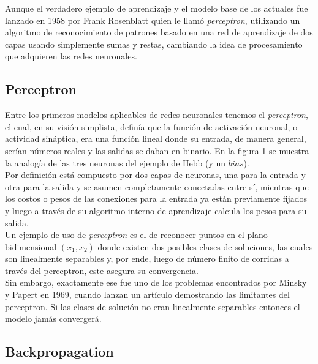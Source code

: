 \documentclass{llncs}
\begin{document}
\begin{multicols}{2}[]
Aunque el verdadero ejemplo de aprendizaje y el modelo base de los actuales fue lanzado en 1958 por Frank Rosenblatt quien le llam\'o
\textit{perceptron}, utilizando un algoritmo de reconocimiento de patrones basado en una red de aprendizaje de dos capas usando
simplemente sumas y restas, cambiando la idea de procesamiento que adquieren las redes neuronales.

\subsection{Perceptron}



Entre los primeros modelos aplicables de redes neuronales tenemos el \textit{perceptron}, el cual, en su visi\'on simplista, defin\'ia que
la funci\'on de activaci\'on neuronal, o actividad sin\'aptica, era una funci\'on lineal donde su entrada, de manera general, ser\'ian n\'umeros
reales y las salidas se daban en binario. En la figura 1 se muestra la analog\'ia de las tres neuronas del ejemplo de Hebb (y un $bias$).\\

Por definici\'on est\'a compuesto por dos capas de neuronas, una para la entrada y otra para la salida y se asumen completamente conectadas
entre s\'i, mientras que los costos o pesos de las conexiones para la entrada ya est\'an previamente fijados y luego a trav\'es de su algoritmo
interno de aprendizaje calcula los pesos para su salida. \\


Un ejemplo de uso de \textit{perceptron} es el de reconocer puntos en el plano bidimensional $(x_1, x_2)$ donde existen dos posibles clases de soluciones,
las cuales son linealmente separables y, por ende, luego de n\'umero finito de corridas a trav\'es del perceptron, este asegura su convergencia. \\

Sin embargo, exactamente ese fue uno de los problemas encontrados por Minsky y \-Papert en 1969, cuando lanzan un art\'iculo demostrando las limitantes
del perceptron. Si las clases de soluci\'on no eran linealmente separables entonces el modelo jam\'as converger\'a.

\subsection{Backpropagation}


\end{multicols}
\end{document}
